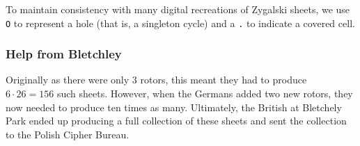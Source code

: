 \noindent To maintain consistency with many digital recreations of Zygalski sheets, we use \texttt{O} to represent a hole (that is, a singleton cycle) and a \texttt{.} to indicate a covered cell.
\subsubsection{Help from Bletchley}
Originally as there were only $3$ rotors, this meant they had to produce $6\cdot 26 = 156$ such sheets. However, when the Germans added two new rotors, they now needed to produce ten times as many. Ultimately, the British at Bletchely Park ended up producing a full collection of these sheets and sent the collection to the Polish Cipher Bureau.

